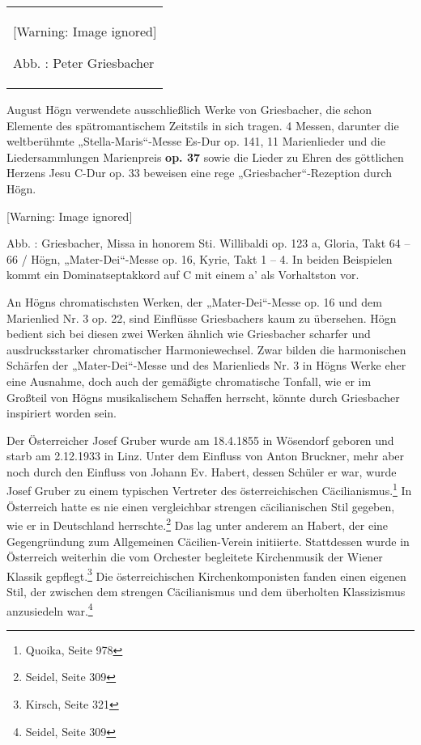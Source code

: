 \documentclass[a4paper]{article}
\newcounter{Abb}
\renewcommand\theAbb{\arabic{Abb}}
\begin{document}
\begin{center}
\begin{minipage}{4.076cm}
\begin{flushleft}
\tablefirsthead{}
\tablehead{}
\tabletail{}
\tablelasttail{}
\begin{supertabular}{m{3.8760002cm}}
  [Warning: Image ignored] %
 
Abb. \stepcounter{Abb}{\theAbb}: Peter Griesbacher\\
\end{supertabular}
\end{flushleft}
\end{minipage}
\end{center}
August Högn verwendete ausschließlich Werke von Griesbacher, die schon
Elemente des spätromantischem Zeitstils in sich tragen. 4 Messen,
darunter die weltberühmte „Stella-Maris“-Messe Es-Dur op. 141, 11
Marienlieder und die Liedersammlungen Marienpreis \textbf{\textmd{op.
37} }sowie die Lieder zu Ehren des göttlichen Herzens Jesu C-Dur op. 33
beweisen eine rege „Griesbacher“-Rezeption durch Högn.

  [Warning: Image ignored] %
 

Abb. \stepcounter{Abb}{\theAbb}: Griesbacher, Missa in honorem Sti.
Willibaldi op. 123 a, Gloria, Takt 64 – 66 / Högn, „Mater-Dei“-Messe
op. 16, Kyrie, Takt 1 – 4. In beiden Beispielen kommt ein
Dominatseptakkord auf C mit einem a’ als Vorhaltston vor.

An Högns chromatischsten Werken, der „Mater-Dei“-Messe op. 16 und dem
Marienlied Nr. 3 op. 22, sind Einflüsse Griesbachers kaum zu übersehen.
Högn bedient sich bei diesen zwei Werken ähnlich wie Griesbacher
scharfer und ausdrucksstarker chromatischer Harmoniewechsel. Zwar
bilden die harmonischen Schärfen der „Mater-Dei“-Messe und des
Marienlieds Nr. 3 in Högns Werke eher eine Ausnahme, doch auch der
gemäßigte chromatische Tonfall, wie er im Großteil von Högns
musikalischem Schaffen herrscht, könnte durch Griesbacher inspiriert
worden sein.

Der Österreicher Josef Gruber wurde am 18.4.1855 in Wösendorf geboren
und starb am 2.12.1933 in Linz. Unter dem Einfluss von Anton Bruckner,
mehr aber noch durch den Einfluss von Johann Ev. Habert, dessen Schüler
er war, wurde Josef Gruber zu einem typischen Vertreter des
österreichischen Cäcilianismus.\footnote{ Quoika, Seite 978} In
Österreich hatte es nie einen vergleichbar strengen cäcilianischen Stil
gegeben, wie er in Deutschland herrschte.\footnote{ Seidel, Seite 309}
Das lag unter anderem an Habert, der eine Gegengründung zum Allgemeinen
Cäcilien-Verein initiierte. Stattdessen wurde in Österreich weiterhin
die vom Orchester begleitete Kirchenmusik der Wiener Klassik
gepflegt.\footnote{ Kirsch, Seite 321} Die österreichischen
Kirchenkomponisten fanden einen eigenen Stil, der zwischen dem strengen
Cäcilianismus und dem überholten Klassizismus anzusiedeln
war.\footnote{ Seidel, Seite 309}
\end{document}
